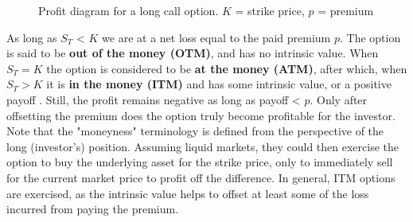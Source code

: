 \documentclass[english,12pt,a4paper,pdftex,sci,utf8]{aaltothesis}
\begin{document}
\begin{center}
\begin{figure}[H]
\centering
    \caption{Profit diagram for a long call option. $K$ = strike price, $p$ = premium}
    \label{fig:long_call_payoff}
\end{figure}
\end{center}

As long as $S_T$ < $K$ we are at a net loss equal to the paid premium $p$. The option is said to be \textbf{out of the money (OTM)}, and has no intrinsic value. When $S_T = K$ the option is considered to be \textbf{at the money (ATM)}, after which, when $S_T > K$ it is \textbf{in the money (ITM)} and has some intrinsic value, or a positive payoff \cite[p. 209]{hull2013fundamentals}. Still, the profit remains negative as long as payoff < $p$. Only  after offsetting the premium does the option truly become profitable for the investor. Note that the "moneyness" terminology is defined from the perspective of the long (investor's) position. Assuming liquid markets, they could then exercise the option to buy the underlying asset for the strike price, only to immediately sell for the current market price to profit off the difference. In general, ITM options are exercised, as the intrinsic value helps to offset at least some of the loss incurred from paying the premium.  
\end{document}
